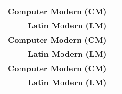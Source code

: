 \documentclass{unittest}
\begin{document}
\begin{tabular}{rl}
\toprule
	\textbf{Computer Modern (CM)} & {\cmfont \UpperAlphabet}
\\	\textbf{Latin Modern (LM)} & {\lmfont \UpperAlphabet}
\\	\textbf{Computer Modern (CM)} & {\cmfont \LowerAlphabet}
\\	\textbf{Latin Modern (LM)} & {\lmfont \LowerAlphabet}
\\	\textbf{Computer Modern (CM)} & {\cmfont \Digits}
\\	\textbf{Latin Modern (LM)} & {\lmfont \Digits}
\\ \bottomrule
\end{tabular}
\end{document}
